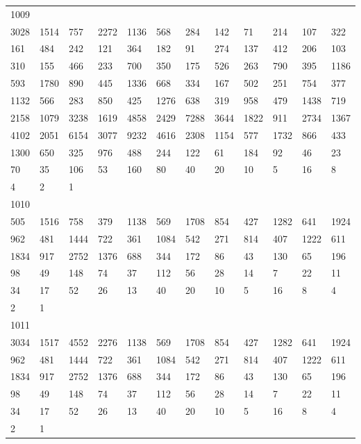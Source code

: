 \begin{longtable}{llllllllllll}
1009&&&&&&&&&&&\\
3028& 1514& 757& 2272& 1136& 568& 284& 142& 71& 214& 107& 322\\
161& 484& 242& 121& 364& 182& 91& 274& 137& 412& 206& 103\\
310& 155& 466& 233& 700& 350& 175& 526& 263& 790& 395& 1186\\
593& 1780& 890& 445& 1336& 668& 334& 167& 502& 251& 754& 377\\
1132& 566& 283& 850& 425& 1276& 638& 319& 958& 479& 1438& 719\\
2158& 1079& 3238& 1619& 4858& 2429& 7288& 3644& 1822& 911& 2734& 1367\\
4102& 2051& 6154& 3077& 9232& 4616& 2308& 1154& 577& 1732& 866& 433\\
1300& 650& 325& 976& 488& 244& 122& 61& 184& 92& 46& 23\\
70& 35& 106& 53& 160& 80& 40& 20& 10& 5& 16& 8\\
4& 2& 1& \\

1010&&&&&&&&&&&\\
505& 1516& 758& 379& 1138& 569& 1708& 854& 427& 1282& 641& 1924\\
962& 481& 1444& 722& 361& 1084& 542& 271& 814& 407& 1222& 611\\
1834& 917& 2752& 1376& 688& 344& 172& 86& 43& 130& 65& 196\\
98& 49& 148& 74& 37& 112& 56& 28& 14& 7& 22& 11\\
34& 17& 52& 26& 13& 40& 20& 10& 5& 16& 8& 4\\
2& 1& \\

1011&&&&&&&&&&&\\
3034& 1517& 4552& 2276& 1138& 569& 1708& 854& 427& 1282& 641& 1924\\
962& 481& 1444& 722& 361& 1084& 542& 271& 814& 407& 1222& 611\\
1834& 917& 2752& 1376& 688& 344& 172& 86& 43& 130& 65& 196\\
98& 49& 148& 74& 37& 112& 56& 28& 14& 7& 22& 11\\
34& 17& 52& 26& 13& 40& 20& 10& 5& 16& 8& 4\\
2& 1& \\


\end{longtable}
